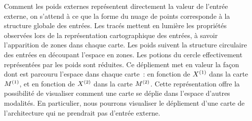 \documentclass[../main]{subfiles}
\begin{document}
Comment les poids externes représentent directement la valeur de l'entrée externe, on s'attend à ce que la forme du nuage de points corresponde à la structure globale des entrées.
Les tracés mettent en lumière les propriétés observées lors de la représentation cartographique des entrées, à savoir l'apparition de zones dans chaque carte. 
Les poids suivent la structure circulaire des entrées en découpant l'espace en zones. Les potions du cercle effectivement représentées par les poids sont réduites.
Ce dépliement met en valeur la façon dont est parcouru l'espace dans chaque carte~: en fonction de $X^{({1})}$ dans la carte $M^{({1})}$, et en fonction de $X^{({2})}$ dans la carte $M^{({2})}$.
Cette représentation offre la possibilité  de visualiser comment une carte se déplie dans l'espace d'autres modalités. En particulier, nous pourrons visualiser le dépliement d'une carte de l'architecture qui ne prendrait pas d'entrée externe.
\end{document}
